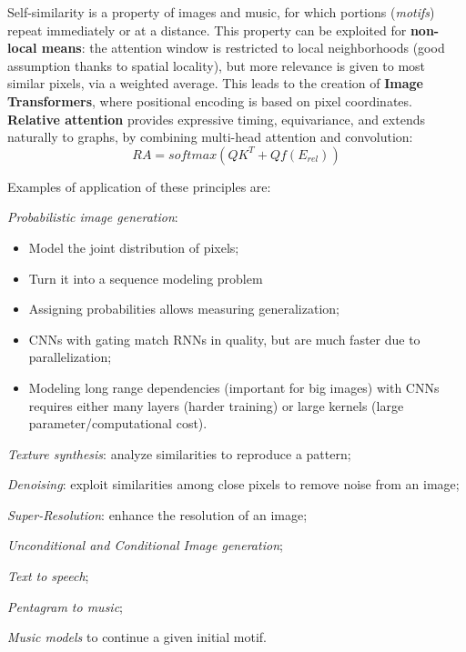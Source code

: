 Self-similarity is a property of images and music, for which portions (\textit{motifs}) repeat immediately or at a distance. This property can be exploited for \textbf{non-local means}: the attention window is restricted to local neighborhoods (good assumption thanks to spatial locality), but more relevance is given to most similar pixels, via a weighted average. This leads to the creation of \textbf{Image Transformers}, where positional encoding is based on pixel coordinates. \textbf{Relative attention} provides expressive timing, equivariance, and extends naturally to graphs, by combining multi-head attention and convolution:
\begin{equation}\label{eq:relative-attention}
    RA = softmax(QK^T + Qf(E_{rel}))
\end{equation}

Examples of application of these principles are:
\begin{myitem}
    \item \textit{Probabilistic image generation}:
    \begin{itemize}
        \item Model the joint distribution of pixels;
        \item Turn it into a sequence modeling problem
        \item Assigning probabilities allows measuring generalization;
        \item CNNs with gating match RNNs in quality, but are much faster due to parallelization;
        \item Modeling long range dependencies (important for big images) with CNNs requires either many layers (harder training) or large kernels (large parameter/computational cost).
    \end{itemize}
    \item \textit{Texture synthesis}: analyze similarities to reproduce a pattern;
    \item \textit{Denoising}: exploit similarities among close pixels to remove noise from an image;
    \item \textit{Super-Resolution}: enhance the resolution of an image;
    \item \textit{Unconditional and Conditional Image generation};
    \item \textit{Text to speech};
    \item \textit{Pentagram to music};
    \item \textit{Music models} to continue a given initial motif.
\end{myitem}


